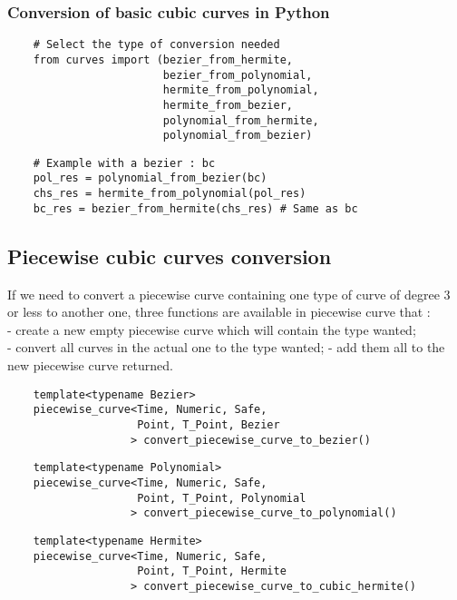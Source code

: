 \documentclass{article}
\begin{document}
    \subsubsection{Conversion of basic cubic curves in Python}
    \begin{lstlisting}
    # Select the type of conversion needed
    from curves import (bezier_from_hermite,
                        bezier_from_polynomial,
                        hermite_from_polynomial,
                        hermite_from_bezier,
                        polynomial_from_hermite,
                        polynomial_from_bezier)
    \end{lstlisting}
    \begin{lstlisting}
    # Example with a bezier : bc
    pol_res = polynomial_from_bezier(bc)
    chs_res = hermite_from_polynomial(pol_res)
    bc_res = bezier_from_hermite(chs_res) # Same as bc
    \end{lstlisting}

\subsection{Piecewise cubic curves conversion}
    If we need to convert a piecewise curve containing one type of curve of
    degree 3 or less to another one, three functions are available
    in piecewise curve that :\\
    - create a new empty piecewise curve which will contain the type wanted;\\
    - convert all curves in the actual one to the type wanted;
    - add them all to the new piecewise curve returned.
    \begin{lstlisting}
    template<typename Bezier>
    piecewise_curve<Time, Numeric, Safe,
                    Point, T_Point, Bezier
                   > convert_piecewise_curve_to_bezier()
    \end{lstlisting}
    \begin{lstlisting}
    template<typename Polynomial>
    piecewise_curve<Time, Numeric, Safe,
                    Point, T_Point, Polynomial
                   > convert_piecewise_curve_to_polynomial()
    \end{lstlisting}
    \begin{lstlisting}
    template<typename Hermite>
    piecewise_curve<Time, Numeric, Safe,
                    Point, T_Point, Hermite
                   > convert_piecewise_curve_to_cubic_hermite()
    \end{lstlisting}
\end{document}
